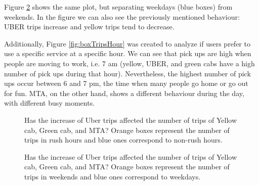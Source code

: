 Figure \ref{fig:boxTripsWeekends} shows the same plot, but separating weekdays (blue boxes) from weekends. In the figure we can also see the previously mentioned behaviour: UBER trips increase and yellow trips tend to decrease.

Additionally, Figure \ref{fig:boxTripsHour} was created to analyze if users prefer to use a specific service at a specific hour. We can see that pick ups are high when people are moving to work, i.e. 7 am (yellow, UBER, and green cabs have a high number of pick ups during that hour). Nevertheless, the highest number of pick ups occur between 6 and 7 pm, the time when many people go home or go out for fun. MTA, on the other hand, shows a different behaviour during the day, with different busy moments.

  
\begin{figure}%
\centering
{}%
\qquad
{}%
\qquad
{}%
\qquad
{}%
\caption{Has the increase of Uber trips affected the number of trips of Yellow cab, Green cab, and MTA? Orange boxes represent the number of trips in rush hours and blue ones correspond to non-rush hours. }
\label{fig:boxTrips}%
\end{figure}







\begin{figure}%
\centering
{}%
\qquad
{}%
\qquad
{}%
\qquad
{}%
\caption{Has the increase of Uber trips affected the number of trips of Yellow cab, Green cab, and MTA? Orange boxes represent the number of trips in weekends and blue ones correspond to weekdays. }
\label{fig:boxTripsWeekends}%
\end{figure}






